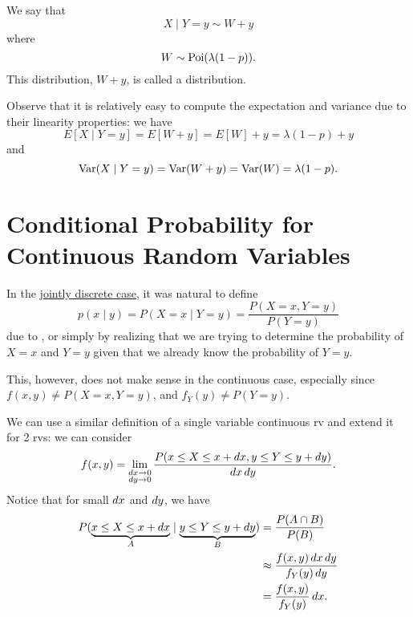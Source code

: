 \documentclass[notoc,notitlepage]{tufte-book}
\begin{document}
\begin{eg}
  We say that
  \begin{equation*}
    X \mid Y = y \sim W + y
  \end{equation*}
  where
  \begin{equation*}
    W \sim \operatorname{Poi}(\lambda(1 - p)).
  \end{equation*}
  This distribution, $W + y$, is called a 
  distribution.

  Observe that it is relatively easy to compute the expectation and variance due
  to their linearity properties: we have
  \begin{equation*}
    E[X \mid Y = y] = E[W + y] = E[W] + y = \lambda(1-p) + y
  \end{equation*}
  and
  \begin{equation*}
    \operatorname{Var}(X \mid Y = y) = \operatorname{Var}(W + y) = \operatorname{Var}(W) = \lambda(1 - p).
  \end{equation*}
\end{eg}


\section{Conditional Probability for Continuous Random Variables}%
\label{sec:conditional_probability_for_continuous_random_variables}

In the
\hyperref[sec:conditional_probability_for_discrete_random_variables]{jointly
discrete case}, it was natural to define
\begin{equation*}
  p(x \mid y) = P(X = x \mid Y = y) = \frac{P(X = x, Y = y)}{P(Y = y)}
\end{equation*}
due to , or simply by realizing that we are trying to
determine the probability of $X = x$ and $Y = y$ given that we already know the
probability of $Y = y$.

This, however, does not make sense in the continuous case, especially since
$f(x, y) \neq P(X = x, Y = y)$, and $f_Y(y) \neq P(Y = y)$.

 We can use a similar
definition of a single variable continuous rv and extend it for 2 rvs: we can
consider
\begin{equation}\label{eq:conditional_prob_for_cts_rvs_inspiration}
  f(x, y) = \lim_{\substack{\mathop{}\!d{x} \to 0 \\ \mathop{}\!d{y} \to 0}} \frac{P(x \leq X
  \leq x + \mathop{}\!d{x}, y \leq Y \leq y + \mathop{}\!d{y})}{\mathop{}\!d{x} \mathop{}\!d{y}}.
\end{equation}
Notice that for small $\mathop{}\!d{x}$ and $\mathop{}\!d{y}$, we have
\begin{align*}
  P(\underbrace{x \leq X \leq x + \mathop{}\!d{x}}_{A} \mid \underbrace{y \leq Y \leq y
  + \mathop{}\!d{y}}_{B})
  &= \frac{P(A \cap B)}{P(B)} \\
  &\approx \frac{f(x,y) \mathop{}\!d{x} \mathop{}\!d{y}}{f_Y(y) \mathop{}\!d{y}} \\
  &= \frac{f(x,y)}{f_Y(y)} \mathop{}\!d{x}.
\end{align*}
\end{document}
